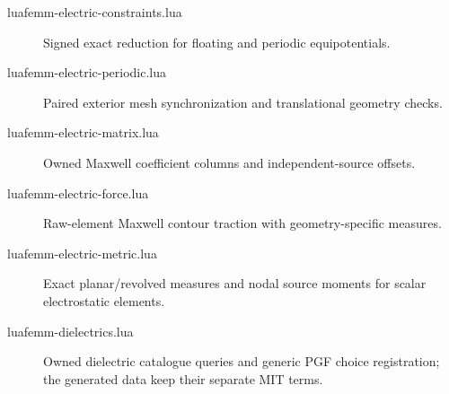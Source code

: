 \begin{description}
\item[luafemm-electric-constraints.lua] Signed exact reduction for floating and periodic equipotentials.
\item[luafemm-electric-periodic.lua] Paired exterior mesh synchronization and translational geometry checks.
\item[luafemm-electric-matrix.lua] Owned Maxwell coefficient columns and independent-source offsets.
\item[luafemm-electric-force.lua] Raw-element Maxwell contour traction with geometry-specific measures.
\item[luafemm-electric-metric.lua] Exact planar/revolved measures and nodal source moments for scalar electrostatic elements.
\item[luafemm-dielectrics.lua] Owned dielectric catalogue queries and generic PGF choice registration; the generated data keep their separate MIT terms.


\end{description}
